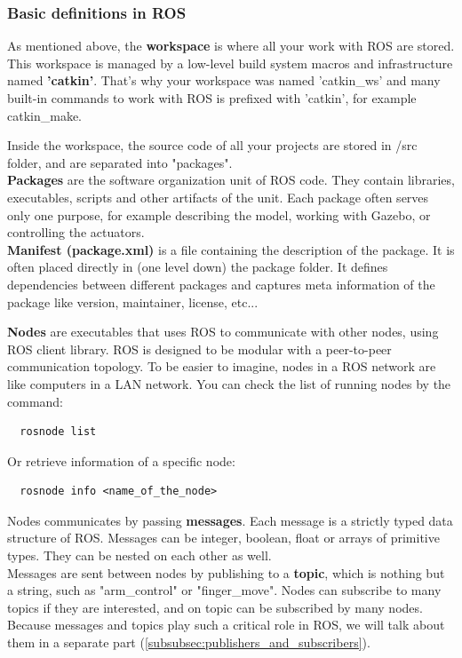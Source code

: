 \documentclass[pdftex,12pt,a4paper]{article}
\begin{document}
  \newpage
  \subsubsection{Basic definitions in ROS}
  As mentioned above, the \textbf{workspace} is where all your work with ROS are stored. This workspace is managed by a low-level build system macros and infrastructure named \textbf{'catkin'}. That's why your workspace was named 'catkin\_ws' and many built-in commands to work with ROS is prefixed with 'catkin', for example catkin\_make.\par
  Inside the workspace, the source code of all your projects are stored in /src folder, and are separated into "packages".\\
  \textbf{Packages} are the software organization unit of ROS code. They contain libraries, executables, scripts and other artifacts of the unit. Each package often serves only one purpose, for example describing the model, working with Gazebo, or controlling the actuators. \\
  \textbf{Manifest (package.xml)} is a file containing the description of the package. It is often placed directly in (one level down) the package folder. It defines dependencies between different packages and captures meta information of the package like version, maintainer, license, etc...\par
  \textbf{Nodes} are executables that uses ROS to communicate with other nodes, using ROS client library. ROS is designed to be modular with a peer-to-peer communication topology. To be easier to imagine, nodes in a ROS network are like computers in a LAN network. You can check the list of running nodes by the command:
  \begin{lstlisting}
  rosnode list
  \end{lstlisting}
  Or retrieve information of a specific node:
  \begin{lstlisting}
  rosnode info <name_of_the_node>
  \end{lstlisting}
  Nodes communicates by passing \textbf{messages}. Each message is a strictly typed data structure of ROS. Messages can be integer, boolean, float or arrays of primitive types. They can be nested on each other as well.\\
  Messages are sent between nodes by publishing to a \textbf{topic}, which is nothing but a string, such as "arm\_control" or "finger\_move". Nodes can subscribe to many topics if they are interested, and on topic can be subscribed by many nodes. Because messages and topics play such a critical role in ROS, we will talk about them in a separate part (\ref{subsubsec:publishers_and_subscribers}).
  
\end{document}
